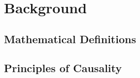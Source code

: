 \newpage
\section{Background}



\subsection{Mathematical Definitions}


\subsection{Principles of Causality}


